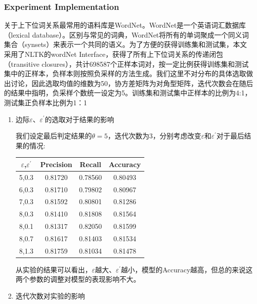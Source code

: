 \documentclass[13pt]{article}
\begin{document}
\subsubsection{Experiment Implementation}
关于上下位词关系最常用的语料库是WordNet。WordNet是一个英语词汇数据库（lexical database）。区别与常见的词典，WordNet将所有的单词聚成一个同义词集合（synsets）来表示一个共同的语义。为了方便的获得训练集和测试集，本文采用了NLTK的wordNet Interface，获得了所有上下位词关系的传递闭包（transitive closures），共计698587个正样本词对，按一定比例获得训练集和测试集中的正样本，负样本则按照负采样的方法生成。我们这里不对分布的具体选取做出讨论，因此选取均值的维数为50，协方差矩阵为对角型矩阵，迭代次数会在随后的结果中指明，负采样个数统一设定为5。训练集和测试集中正样本的比例为4:1，测试集正负样本比例为1：1
\begin{enumerate}[label=\Roman*.]
	\item 边际$\varepsilon$、$\varepsilon^{'}$的选取对于结果的影响

我们设定最后判定结果的$\theta=5$，迭代次数为3，分别考虑改变$\varepsilon$和$\varepsilon^{'}$对于最后结果的情况:
\begin{center}
\begin{tabular}{| c | c | c | c |}
	\hline
	$\varepsilon$,$\varepsilon^{'}$ & Precision & Recall & Accuracy \\
	\hline
	5,0.3 & 0.81720 & 0.78560 & 0.80493 \\
	\hline
	6,0.3 & 0.81710 & 0.79802 & 0.80967 \\
	\hline
	7,0.3 & 0.81592 & 0.80801 & 0.81286 \\
	\hline
	8,0.3 & 0.81410 & 0.81808 & 0.81564 \\
	\hline
	8,0.1 & 0.81317 & 0.82050 & 0.81599 \\
	\hline
	8,0.7 & 0.81617 & 0.81403 & 0.81534 \\
	\hline
	8,1.3 & 0.81759 & 0.81034 & 0.81478 \\
	\hline
\end{tabular}
\end{center}
从实验的结果可以看出，$\varepsilon$越大、$\varepsilon^{'}$越小，模型的Accuracy越高，但总的来说这两个参数的调整对模型的表现影响不大。

\item 迭代次数对实验的影响
 

\end{enumerate}
\end{document}

